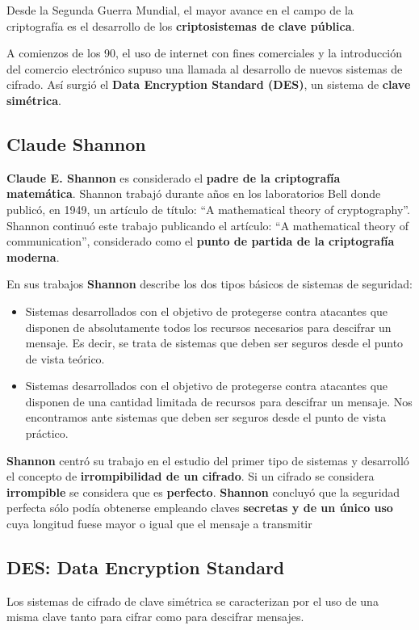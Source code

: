 \documentclass[nochap]{apuntesURJC}
\begin{document}
Desde la Segunda Guerra Mundial, el mayor avance en el campo de la criptografía es el desarrollo de los \textbf{criptosistemas de clave pública}.

A comienzos de los 90, el uso de internet con fines comerciales y la introducción del comercio electrónico supuso una llamada al desarrollo de nuevos sistemas de cifrado. Así surgió el \textbf{Data Encryption Standard (DES)}, un sistema de \textbf{clave simétrica}.

\subsection{Claude Shannon}
\textbf{Claude E. Shannon} es considerado el \textbf{padre de la criptografía matemática}. Shannon trabajó durante años en los laboratorios Bell donde publicó, en 1949, un artículo de título: ``A mathematical theory of cryptography''. Shannon continuó este trabajo publicando el artículo: ``A mathematical theory of communication'', considerado como el \textbf{punto de partida de la criptografía moderna}.

En sus trabajos \textbf{Shannon} describe los dos tipos básicos de sistemas de seguridad:
\begin{itemize}
\item Sistemas desarrollados con el objetivo de protegerse contra atacantes que disponen de absolutamente todos los recursos necesarios para descifrar un mensaje. Es decir, se trata de sistemas que deben ser seguros desde el punto de vista teórico.
\item Sistemas desarrollados con el objetivo de protegerse contra atacantes que disponen de una cantidad limitada de recursos para descifrar un mensaje. Nos encontramos ante sistemas que deben ser seguros desde el punto de vista práctico.
\end{itemize}

\textbf{Shannon} centró su trabajo en el estudio del primer tipo de sistemas y desarrolló el concepto de \textbf{irrompibilidad de un cifrado}. Si un cifrado se considera \textbf{irrompible} se considera que es \textbf{perfecto}. \textbf{Shannon} concluyó que la seguridad perfecta sólo podía obtenerse empleando claves \textbf{secretas y de un único uso} cuya longitud fuese mayor o igual que el mensaje a transmitir

\subsection{DES: Data Encryption Standard}
Los sistemas de cifrado de clave simétrica se caracterizan por el uso de una misma clave tanto para cifrar como para descifrar mensajes.
\end{document}
